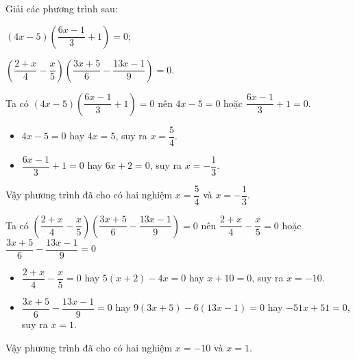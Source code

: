 \begin{vd}%
	Giải các phương trình sau:
	\begin{listEX}[2]
	\item $(4x - 5)\left( \dfrac{6x - 1}{3} + 1 \right) = 0$; 
	\item $\left( \dfrac{2+x}{4} - \dfrac{x}{5}\right) \left(\dfrac{3x+5}{6} - \dfrac{13x - 1}{9}\right) = 0. $ 
	\end{listEX}
	\loigiai
	{
	\begin{listEX}
	\item 
	Ta có 
	$(4x - 5)\left( \dfrac{6x - 1}{3} + 1 \right) = 0$ nên $4x - 5=0$ hoặc $\dfrac{6x - 1}{3} + 1=0$.
	\begin{itemize}
		\item $4x - 5 = 0$ hay $4x = 5$, suy ra $x = \dfrac{5}{4}$.
		\item $\dfrac{6x - 1}{3} + 1= 0$  hay $6x + 2 = 0$, suy ra $x = -\dfrac{1}{3}$.
	\end{itemize}
	Vậy phương trình đã cho có hai nghiệm $x=\dfrac{5}{4}$ và $x=-\dfrac{1}{3}$.
	\item 
	Ta có
	$\left( \dfrac{2+x}{4} - \dfrac{x}{5}\right) \left(\dfrac{3x+5}{6} - \dfrac{13x - 1}{9}\right) = 0$ nên
	 $\dfrac{2+x}{4} - \dfrac{x}{5} = 0$ hoặc $\dfrac{3x + 5}{6} - \dfrac{13x - 1}{9} = 0$
 	\begin{itemize}
 		\item $\dfrac{2+x}{4} - \dfrac{x}{5} = 0$ hay $5(x + 2) - 4x = 0$ hay 
 		$x + 10 = 0$, suy ra $x = -10$.
 		\item $\dfrac{3x + 5}{6} - \dfrac{13x - 1}{9} = 0$ hay $9(3x + 5) - 6(13x - 1) = 0$
 	hay $-51 x + 51 = 0$, suy ra $x = 1$.
 	\end{itemize}
	Vậy phương trình đã cho có hai nghiệm $x=-10$ và $x=1$.	
	\end{listEX}
	}
\end{vd}
\begin{vd}
\end{vd}
